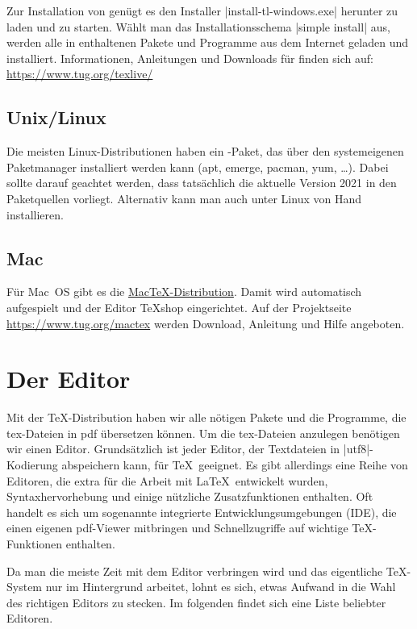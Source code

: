 \documentclass[
	ausgabe=2022-02-07,
	titel=Installationshinweise,
	shortverb=true,
]{../tex/latexkurs-exercise}
\begin{document}
Zur Installation von \TeXlive genügt es den Installer |install-tl-windows.exe| herunter zu laden und zu starten. Wählt man das Installationsschema |simple install| aus, werden alle in \TeXlive enthaltenen Pakete und Programme aus dem Internet geladen und installiert. Informationen, Anleitungen und Downloads für \TeXlive finden sich auf:\\ \url{https://www.tug.org/texlive/}

\subsection*{Unix/Linux}
Die meisten Linux-Distributionen haben ein \TeXlive-Paket, das über den systemeigenen Paketmanager installiert werden kann (apt, emerge, pacman, yum, …).
Dabei sollte darauf geachtet werden, dass tatsächlich die aktuelle Version 2021 in den Paketquellen vorliegt. Alternativ kann man \TeXlive auch unter Linux von Hand installieren.


\subsection*{Mac}
Für Mac~OS gibt es die \href{https://www.tug.org/mactex}{Mac\TeX-Distribution}. Damit wird automatisch  \TeXlive aufgespielt und  der Editor \TeX shop eingerichtet. Auf der Projektseite \url{https://www.tug.org/mactex} werden Download, Anleitung und Hilfe angeboten.





\section{Der Editor}

Mit der \TeX-Distribution haben wir alle nötigen Pakete und die Programme, die tex-Dateien in pdf übersetzen können. Um die tex-Dateien anzulegen benötigen wir einen Editor. Grundsätzlich ist jeder Editor, der Textdateien in |utf8|-Kodierung abspeichern kann, für \TeX\ geeignet. Es gibt allerdings eine Reihe von Editoren, die extra für die Arbeit mit \LaTeX\ entwickelt wurden, Syntaxhervorhebung und einige nützliche Zusatzfunktionen enthalten. Oft handelt es sich um sogenannte integrierte Entwicklungsumgebungen (IDE), die einen eigenen pdf-Viewer mitbringen und Schnellzugriffe auf wichtige \TeX-Funktionen enthalten.

Da man die meiste Zeit mit dem Editor verbringen wird und das eigentliche \TeX-System nur im Hintergrund arbeitet, lohnt es sich, etwas Aufwand in die Wahl des richtigen Editors zu stecken. Im folgenden findet sich eine Liste beliebter Editoren.
\end{document}
